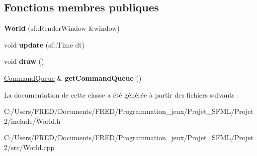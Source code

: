 \subsection*{Fonctions membres publiques}
\begin{DoxyCompactItemize}
\item 
{\bfseries World} (sf\+::\+Render\+Window \&window)\hypertarget{class_world_a00985c4e0cb3b402e13698319a63cd62}{}\label{class_world_a00985c4e0cb3b402e13698319a63cd62}

\item 
void {\bfseries update} (sf\+::\+Time dt)\hypertarget{class_world_ac7b3a3923c95b812ec2d00d97c8cd56e}{}\label{class_world_ac7b3a3923c95b812ec2d00d97c8cd56e}

\item 
void {\bfseries draw} ()\hypertarget{class_world_ab51a17ccbb108616daacd0c34973dc8d}{}\label{class_world_ab51a17ccbb108616daacd0c34973dc8d}

\item 
\hyperlink{class_command_queue}{Command\+Queue} \& {\bfseries get\+Command\+Queue} ()\hypertarget{class_world_af224b413f30c86ec99d042d0f4df56ee}{}\label{class_world_af224b413f30c86ec99d042d0f4df56ee}

\end{DoxyCompactItemize}


La documentation de cette classe a été générée à partir des fichiers suivants \+:\begin{DoxyCompactItemize}
\item 
C\+:/\+Users/\+F\+R\+E\+D/\+Documents/\+F\+R\+E\+D/\+Programmation\+\_\+jeux/\+Projet\+\_\+\+S\+F\+M\+L/\+Projet2/include/World.\+h\item 
C\+:/\+Users/\+F\+R\+E\+D/\+Documents/\+F\+R\+E\+D/\+Programmation\+\_\+jeux/\+Projet\+\_\+\+S\+F\+M\+L/\+Projet2/src/World.\+cpp\end{DoxyCompactItemize}
